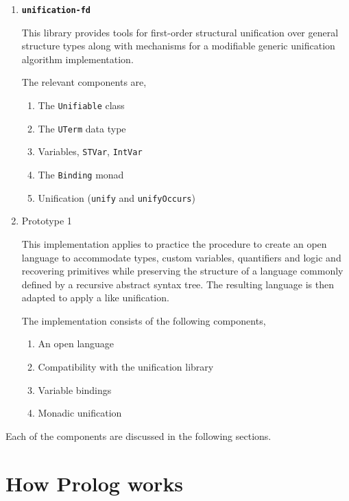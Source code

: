 \documentclass[thesis-solanki.tex]{subfiles}
\providecommand\codeLibrary[1]{\texttt{\bfseries #1}}
\begin{document}
\begin{enumerate}
\item \codeLibrary{unification-fd} \cite{unification-fd-lib}

This library provides tools for first-order structural unification over general structure types along with mechanisms for a modifiable
generic unification algorithm implementation.

The relevant components are,
\begin{enumerate}
\item The \Verb!Unifiable! class

\item The \Verb!UTerm! data type

\item Variables,
  \Verb!STVar!, \Verb!IntVar!

\item The \Verb!Binding! monad

\item Unification (\Verb!unify! and \Verb!unifyOccurs!)
\end{enumerate}

\item Prototype 1

  This implementation applies to practice the procedure to create an open language to accommodate types,
  custom variables, quantifiers and logic and recovering primitives while preserving the structure of a
  language commonly defined by a recursive abstract syntax tree.
  The resulting language is then adapted to apply a  like unification.

The implementation consists of the following components,
\begin{enumerate}
\item An open language

\item Compatibility with the unification library \cite{unification-fd-lib}

\item Variable bindings

\item Monadic unification

\end{enumerate}
\end{enumerate}

Each of the components are discussed in the following sections.


\section{How Prolog works}
\end{document}
